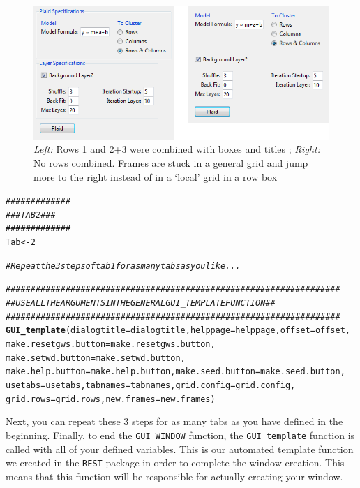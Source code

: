 \documentclass[a4paper]{article}\usepackage[]{graphicx}\usepackage[]{color}
\makeatletter
\newcommand{\hlnum}[1]{\textcolor[rgb]{0.686,0.059,0.569}{#1}}%
\newcommand{\hlcom}[1]{\textcolor[rgb]{0.678,0.584,0.686}{\textit{#1}}}%
\newcommand{\hlstd}[1]{\textcolor[rgb]{0.345,0.345,0.345}{#1}}%
\newcommand{\hlkwb}[1]{\textcolor[rgb]{0.69,0.353,0.396}{#1}}%
\newcommand{\hlkwc}[1]{\textcolor[rgb]{0.333,0.667,0.333}{#1}}%
\newcommand{\hlkwd}[1]{\textcolor[rgb]{0.737,0.353,0.396}{\textbf{#1}}}%
\newenvironment{kframe}{%
 \def\at@end@of@kframe{}%
 \ifinner\ifhmode%
  \def\at@end@of@kframe{\end{minipage}}%
  \begin{minipage}{\columnwidth}%
 \fi\fi%
 \def\FrameCommand##1{\hskip\@totalleftmargin \hskip-\fboxsep
 \colorbox{shadecolor}{##1}\hskip-\fboxsep
     \hskip-\linewidth \hskip-\@totalleftmargin \hskip\columnwidth}%
 \MakeFramed {\advance\hsize-\width
   \@totalleftmargin\z@ \linewidth\hsize
   \@setminipage}}%
 {\par\unskip\endMakeFramed%
 \at@end@of@kframe}
\newenvironment{knitrout}{}{} %
\makeatother
\begin{document}
\begin{figure}[H]
\centering
\includegraphics[scale=0.4]{figures/combinerows_grid.png}
\caption{{\it Left:} Rows 1 and 2+3 were combined with boxes and titles ; {\it
Right:} No rows combined. Frames are stuck in a general grid and jump more to
the right instead of in a `local' grid in a row box \label{combinerows_grid}}
\end{figure}

\begin{knitrout}
\color{fgcolor}\begin{kframe}
\begin{alltt}
\hlcom{#############}
\hlcom{### TAB 2 ###}
\hlcom{#############}
\hlstd{Tab} \hlkwb{<-} \hlnum{2}

\hlcom{# Repeat the 3 steps of tab 1 for as many tabs as you like...}


\hlcom{###################################################################}
\hlcom{## USE ALL THE ARGUMENTS IN THE GENERAL GUI_TEMPLATE FUNCTION    ##}
\hlcom{###################################################################}
\hlkwd{GUI_template}\hlstd{(}\hlkwc{dialogtitle}\hlstd{=dialogtitle,}\hlkwc{helppage}\hlstd{=helppage,}\hlkwc{offset}\hlstd{=offset,}
  \hlkwc{make.resetgws.button}\hlstd{=make.resetgws.button,}
  \hlkwc{make.setwd.button}\hlstd{=make.setwd.button,}
  \hlkwc{make.help.button}\hlstd{=make.help.button,}\hlkwc{make.seed.button}\hlstd{=make.seed.button,}
  \hlkwc{usetabs}\hlstd{=usetabs,}\hlkwc{tabnames}\hlstd{=tabnames,}\hlkwc{grid.config}\hlstd{=grid.config,}
  \hlkwc{grid.rows}\hlstd{=grid.rows,}\hlkwc{new.frames}\hlstd{=new.frames)}
\end{alltt}
\end{kframe}
\end{knitrout}
\noindent Next, you can repeat these 3 steps for as many tabs as you have
defined in the beginning. Finally, to end the \verb|GUI_WINDOW| function, the
\verb|GUI_template| function is called with all of your defined variables. 
This is our automated template function we created in the \verb|REST| package in
order to complete the window creation. This means that this function will be responsible
for actually creating your window.
\end{document}
